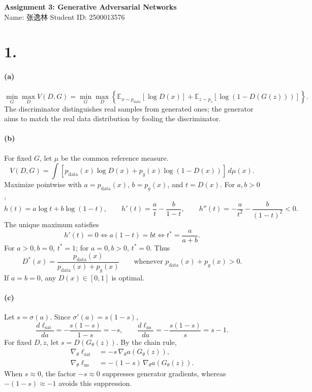 \documentclass[11pt,a4paper]{article}
\newcommand{\E}{\mathbb{E}}
\newcommand{\pdata}{p_{\mathrm{data}}}
\begin{document}
\begin{center}
  {\Large\bfseries Assignment 3: Generative Adversarial Networks}\\[8pt]
  Name: 张逸林
  \hspace{8mm}
  Student ID: 2500013576
\end{center}

\section*{1.}

\paragraph{(a)}
\[
\min_G\max_D V(D,G)
=
\min_G\max_D
\left\{
\E_{x\sim\pdata}[\log D(x)]
+
\E_{z\sim p_z}[\log(1-D(G(z)))]
\right\}.
\]
The discriminator distinguishes real samples from generated ones; the
generator aims to match the real data distribution by fooling the discriminator.

\paragraph{(b)}
For fixed \(G\), let \(\mu\) be the common reference measure.
\[
V(D,G)=\int
\left[\pdata(x)\log D(x)+p_g(x)\log(1-D(x))\right]\,d\mu(x).
\]
Maximize pointwise with \(a=\pdata(x)\), \(b=p_g(x)\), and \(t=D(x)\).
For \(a,b>0\),
\[
h(t)=a\log t+b\log(1-t),\qquad
h'(t)=\frac{a}{t}-\frac{b}{1-t},\qquad
h''(t)=-\frac{a}{t^2}-\frac{b}{(1-t)^2}<0.
\]
The unique maximum satisfies
\[
h'(t)=0\iff a(1-t)=bt\iff t^*=\frac{a}{a+b}.
\]
For \(a>0,b=0\), \(t^*=1\); for \(a=0,b>0\), \(t^*=0\). Thus
\[
\boxed{D^*(x)=\frac{\pdata(x)}{\pdata(x)+p_g(x)}}
\qquad\text{whenever }\pdata(x)+p_g(x)>0.
\]
If \(a=b=0\), any \(D(x)\in[0,1]\) is optimal.

\paragraph{(c)}
Let \(s=\sigma(a)\). Since \(\sigma'(a)=s(1-s)\),
\[
\frac{d\ell_{\mathrm{sat}}}{da}
=-\frac{s(1-s)}{1-s}=-s,
\qquad
\frac{d\ell_{\mathrm{ns}}}{da}
=-\frac{s(1-s)}{s}=s-1.
\]
For fixed \(D,z\), let \(s=D(G_\theta(z))\). By the chain rule,
\[
\begin{aligned}
\nabla_\theta\ell_{\mathrm{sat}}
&=-s\,\nabla_\theta a(G_\theta(z)),\\
\nabla_\theta\ell_{\mathrm{ns}}
&=-(1-s)\,\nabla_\theta a(G_\theta(z)).
\end{aligned}
\]
When \(s\approx0\), the factor \(-s\approx0\) suppresses generator gradients,
whereas \(-(1-s)\approx-1\) avoids this suppression.
\end{document}
